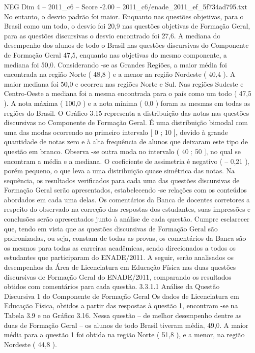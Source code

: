 \begin{textsample}{NEG Dim 4 – 2011\_c6 – Score -2.00 – 2011\_c6/enade\_2011\_ef\_5f734ad795.txt}
No entanto, o desvio padrão foi maior.
Enquanto nas questões objetivas, para o Brasil como um todo, o desvio foi 20,9 nas questões objetivas de Formação Geral, para as questões discursivas o desvio encontrado foi 27,6.
A mediana do desempenho dos alunos de todo o Brasil nas questões discursivas do Componente de Formação Geral 47,5, enquanto nas objetivas do mesmo componente, a mediana foi 50,0.
Considerando -se as Grandes Regiões, a maior média foi encontrada na região Norte ( 48,8 ) e a menor na região Nordeste ( 40,4 ).
A maior mediana foi 50,0 e ocorreu nas regiões Norte e Sul.
Nas regiões Sudeste e Centro-Oeste a mediana foi a mesma encontrada para o país como um todo ( 47,5 ).
A nota máxima ( 100,0 ) e a nota mínima ( 0,0 ) foram as mesmas em todas as regiões do Brasil.
O Gráfico 3.15 representa a distribuição das notas nas questões discursivas no Componente de Formação Geral.
É uma distribuição bimodal com uma das modas ocorrendo no primeiro intervalo [ 0 ; 10 ], devido à grande quantidade de notas zero e à alta frequência de alunos que deixaram este tipo de questão em branco.
Observa -se outra moda no intervalo ( 40 ; 50 ], no qual se encontram a média e a mediana.
O coeficiente de assimetria é negativo ( – 0,21 ), porém pequeno, o que leva a uma distribuição quase simétrica das notas.
Na sequência, os resultados verificados para cada uma das questões discursivas de Formação Geral serão apresentados, estabelecendo -se relações com os conteúdos abordados em cada uma delas.
Os comentários da Banca de docentes corretores a respeito do observado na correção das respostas dos estudantes, suas impressões e conclusões serão apresentados junto à análise de cada questão.
Cumpre esclarecer que, tendo em vista que as questões discursivas de Formação Geral são padronizadas, ou seja, constam de todas as provas, os comentários da Banca são os mesmos para todas as carreiras acadêmicas, sendo direcionados a todos os estudantes que participaram do ENADE/2011.
A seguir, serão analisados os desempenhos da Área de Licenciatura em Educação Física nas duas questões discursivas de Formação Geral do ENADE/2011, comparando os resultados obtidos com comentários para cada questão. 3.3.1.1 Análise da Questão Discursiva 1 do Componente de Formação Geral Os dados de Licenciatura em Educação Física, obtidos a partir das respostas à questão 1, encontram -se na Tabela 3.9 e no Gráfico 3.16.
Nessa questão – de melhor desempenho dentre as duas de Formação Geral – os alunos de todo Brasil tiveram média, 49,0.
A maior média para a questão 1 foi obtida na região Norte ( 51,8 ), e a menor, na região Nordeste ( 44,8 ).

\end{textsample}
